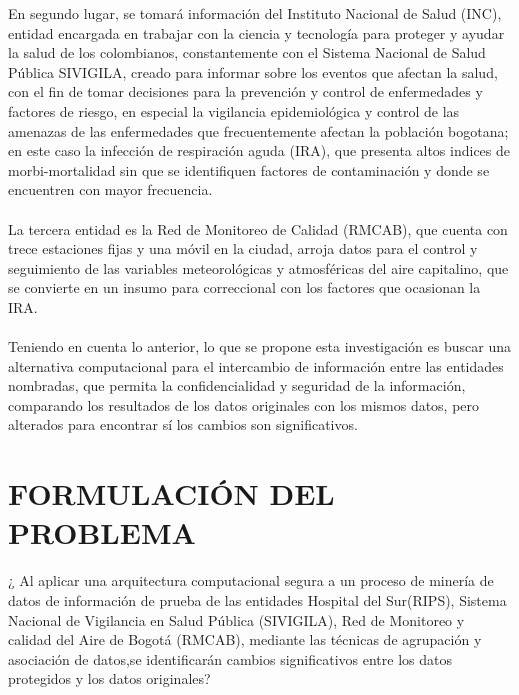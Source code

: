 \documentclass[a4paper,openright,12pt]{book}
\theoremstyle{definition}
\theoremstyle{remark}
\begin{document}
En segundo lugar, se tomará información del Instituto Nacional de Salud (INC), entidad encargada en trabajar con la ciencia y tecnología para proteger y ayudar la salud de los colombianos, constantemente con el Sistema Nacional de Salud Pública SIVIGILA, creado para informar sobre los eventos que afectan la salud, con el fin de tomar decisiones para la prevención y control de enfermedades y factores de riesgo, en especial la vigilancia epidemiológica y control de las amenazas de las enfermedades que frecuentemente afectan la población bogotana; en este caso la infección de respiración aguda (IRA), que presenta altos indices de morbi-mortalidad sin que se identifiquen factores de contaminación y donde se encuentren con mayor frecuencia.\\\\
La tercera entidad es la Red de Monitoreo de Calidad (RMCAB), que cuenta con trece estaciones fijas y una móvil en la ciudad, arroja datos para el control y seguimiento de las variables meteorológicas y atmosféricas del aire capitalino, que se convierte en un insumo para correccional con los factores que ocasionan la IRA.\\\\
Teniendo  en cuenta lo anterior, lo  que se propone  esta investigación es buscar una alternativa computacional para el intercambio de información entre las entidades nombradas, que permita la confidencialidad y seguridad de la información, comparando los resultados de los datos originales con los mismos datos, pero alterados para encontrar sí los cambios son significativos.

\section{FORMULACIÓN DEL PROBLEMA}

¿ Al aplicar una arquitectura computacional segura a un proceso de minería de datos de información de prueba de las entidades Hospital del Sur(RIPS), Sistema Nacional de Vigilancia en Salud Pública (SIVIGILA), Red de Monitoreo y calidad del Aire de Bogotá (RMCAB), mediante las técnicas de agrupación y asociación de datos,se identificarán cambios significativos entre los datos protegidos y los datos originales?
\end{document}
